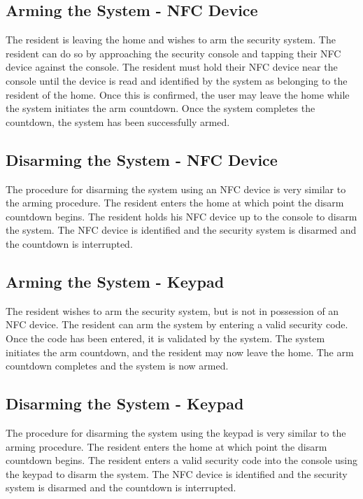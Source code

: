 \documentclass{report}
\begin{document}
\subsection*{Arming the System - NFC Device}

The resident is leaving the home and wishes to arm the security system. The
resident can do so by approaching the security console and tapping their NFC
device against the console. The resident must hold their NFC
device near the console until the device is read and identified by the system
as belonging to the resident of the home. Once this is confirmed, the user may
leave the home while the system initiates the arm countdown. Once the system
completes the countdown, the system has been successfully armed.

\subsection*{Disarming the System - NFC Device}

The procedure for disarming the system using an NFC device is very similar to
the arming procedure. The resident enters the home at which point the disarm
countdown begins. The resident holds his NFC device up to the console to disarm
the system. The NFC device is identified and the security system is disarmed
and the countdown is interrupted.

\subsection*{Arming the System - Keypad}

The resident wishes to arm the security system, but is not in possession of an
NFC device.  The resident can arm the system by entering a valid security code.
Once the code has been entered, it is validated by the system. The system
initiates the arm countdown, and the resident may now leave the home. The arm
countdown completes and the system is now armed.

\subsection*{Disarming the System - Keypad}

The procedure for disarming the system using the keypad is very similar to the
arming procedure. The resident enters the home at which point the disarm
countdown begins. The resident enters a valid security code into the console
using the keypad to disarm the system.  The NFC device is identified and the
security system is disarmed and the countdown is interrupted.
\end{document}
